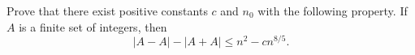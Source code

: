 Prove that there exist positive constants $c$ and $n_0$ with the following property. If $A$ is a finite set of integers,  then
\[ |A - A| - |A + A| \leq n^2 - c n^{8/5}.\]
